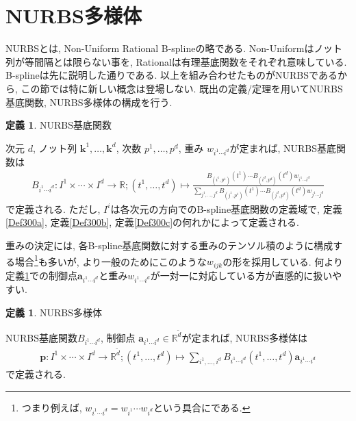 \documentclass{jsarticle}
\newcommand\setR{\mathbb{R}}
\theoremstyle{definition}%
\newtheorem{defn}[thm]{定義}
\newcommand\UC{\textcolor{red}{(執筆中です)}}
\begin{document}
%
%
%
%
%


\newpage
\section{NURBS多様体}
NURBSとは, Non-Uniform Rational B-splineの略である.
Non-Uniformはノット列が等間隔とは限らない事を, Rationalは有理基底関数をそれぞれ意味している.
B-splineは先に説明した通りである.
以上を組み合わせたものがNURBSであるから, この節では特に新しい概念は登場しない.
既出の定義/定理を用いてNURBS基底関数, NURBS多様体の構成を行う.

\begin{screen}
	\begin{defn}
        NURBS基底関数

        次元 $d$, ノット列 $\bm{k}^1,\dots,\bm{k}^d$, 次数 $p^1,\dots,p^d$, 重み $w_{i^1\cdots i^d}$が定まれば, NURBS基底関数は
		\begin{align}
            B_{i^1\cdots i^d}:I^1\times\cdots\times I^d\to\setR;
            (t^1,\dots,t^d)\mapsto\frac{B_{(i^1,p^1)}(t^1)\cdots B_{(i^d,p^d)}(t^d)w_{i^1\cdots i^d}}{\sum\limits_{j^1,\dots,j^d}B_{(j^1,p^1)}(t^1)\cdots B_{(j^d,p^d)}(t^d)w_{j^1\cdots j^d}}
		\end{align}
		で定義される.
        ただし, $I^i$は各次元の方向でのB-spline基底関数の定義域で, 定義\ref{Def300a}, 定義\ref{Def300b}, 定義\ref{Def300c}の何れかによって定義される.
	\end{defn}
\end{screen}
重みの決定には, 各B-spline基底関数に対する重みのテンソル積のように構成する場合\footnote{つまり例えば, $w_{i^1\cdots i^d}=w_{i^1}\cdots w_{i^d}$という具合にである.}も多いが, より一般のためにこのような$w_{ijk}$の形を採用している.
何より定義\ref{Def501}での制御点$\bm{a}_{i^1\cdots i^d}$と重み$w_{i^1\cdots i^d}$が一対一に対応している方が直感的に扱いやすい.

\begin{screen}
	\begin{defn}
        \label{Def501}
        NURBS多様体

        NURBS基底関数$B_{i^1\cdots i^d}$, 制御点 $\bm{a}_{i^1\cdots i^d}\in\setR^{\tilde{d}}$が定まれば, NURBS多様体は
		\begin{align}
            \bm{p}:I^1\times\cdots\times I^d\to\setR^{\tilde{d}};
            (t^1,\dots,t^d)\mapsto\sum_{i^1,\dots,i^d} B_{i^1\cdots i^d}(t^1,\dots,t^d)\bm{a}_{i^1\cdots i^d}
		\end{align}
		で定義される.
	\end{defn}
\end{screen}
\end{document}
